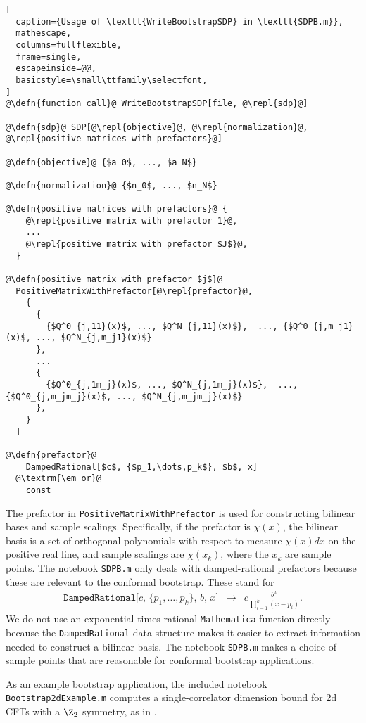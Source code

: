 \documentclass[12pt]{article}
\numberwithin{equation}{section}
\renewcommand{\be}{\begin{eqnarray}}
\renewcommand{\ee}{\end{eqnarray}}
\newcommand\repl[1]{$\langle$\textrm{\em #1}$\rangle$}
\newcommand\defn[1]{\textrm{\em #1}\ $\equiv$}
\begin{document}
\begin{lstlisting}[
  caption={Usage of \texttt{WriteBootstrapSDP} in \texttt{SDPB.m}},
  mathescape,
  columns=fullflexible,
  frame=single,
  escapeinside=@@,
  basicstyle=\small\ttfamily\selectfont,
]
@\defn{function call}@ WriteBootstrapSDP[file, @\repl{sdp}@]

@\defn{sdp}@ SDP[@\repl{objective}@, @\repl{normalization}@, @\repl{positive matrices with prefactors}@]

@\defn{objective}@ {$a_0$, ..., $a_N$}

@\defn{normalization}@ {$n_0$, ..., $n_N$}

@\defn{positive matrices with prefactors}@ {
    @\repl{positive matrix with prefactor 1}@,
    ...
    @\repl{positive matrix with prefactor $J$}@,
  }

@\defn{positive matrix with prefactor $j$}@
  PositiveMatrixWithPrefactor[@\repl{prefactor}@,
    {
      {
        {$Q^0_{j,11}(x)$, ..., $Q^N_{j,11}(x)$},  ..., {$Q^0_{j,m_j1}(x)$, ..., $Q^N_{j,m_j1}(x)$}
      },
      ...
      {
        {$Q^0_{j,1m_j}(x)$, ..., $Q^N_{j,1m_j}(x)$},  ..., {$Q^0_{j,m_jm_j}(x)$, ..., $Q^N_{j,m_jm_j}(x)$}
      },
    }
  ]
  
@\defn{prefactor}@
    DampedRational[$c$, {$p_1,\dots,p_k$}, $b$, x]
  @\textrm{\em or}@
    const  
\end{lstlisting}

The prefactor in \texttt{PositiveMatrixWithPrefactor} is used for constructing bilinear bases and sample scalings.  Specifically, if the prefactor is $\chi(x)$, the bilinear basis is a set of orthogonal polynomials with respect to measure $\chi(x)dx$ on the positive real line, and sample scalings are $\chi(x_k)$, where the $x_k$ are sample points.
 The notebook \texttt{SDPB.m} only deals with damped-rational prefactors because these are relevant to the conformal bootstrap.  These stand for
\be
\texttt{DampedRational[$c$, \{$p_1,\dots,p_k$\}, $b$, $x$]} &\to& c\frac{b^x}{\prod_{i=1}^k (x-p_i)}.
\ee
We do not use an exponential-times-rational \texttt{Mathematica} function directly because the  \texttt{DampedRational} data structure makes it easier to extract information needed to construct a bilinear basis.  The notebook \texttt{SDPB.m} makes a choice of sample points that are reasonable for conformal bootstrap applications.

As an example bootstrap application, the included notebook \texttt{Bootstrap2dExample.m} computes a single-correlator dimension bound for 2d CFTs with a $\Z_2$ symmetry, as in \cite{Rychkov:2009ij}.
\end{document}
